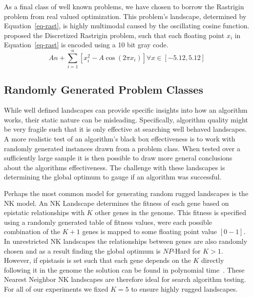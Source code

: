 \documentclass[twoside]{article}
\begin{document}
As a final class of well known problems, we have chosen to borrow the Rastrigin problem from real valued
optimization. This problem's landscape, determined by Equation~\ref{eq-rast}, is highly multimodal caused by
the oscillating cosine function. \cite{goldman:2014:p3} proposed the Discretized Rastrigin problem, such
that each floating point $x_i$ in Equation~\ref{eq-rast} is encoded using a 10 bit gray code.
\begin{equation}
  An + \sum_{i=1}^{n}\left [ x_i^2-A\cos (2\pi x_i) \right ] \forall x\in [-5.12,5.12]
  \label{eq-rast}
\end{equation}

\subsection{Randomly Generated Problem Classes}
While well defined landscapes can provide specific insights into how an algorithm works,
their static nature can be misleading. Specifically, algorithm quality might
be very fragile such that it is only effective at searching well behaved landscapes. A more realistic
test of an algorithm's black box effectiveness is to work with randomly generated instances
drawn from a problem class. When tested over a sufficiently large sample it is then possible
to draw more general conclusions about the algorithms effectiveness. The challenge with these
landscapes is determining the global optimum to gauge if an algorithm was successful.

Perhaps the most common model for generating random rugged landscapes is the NK model. An
NK Landscape determines the fitness of each gene based on epistatic relationships with $K$
other genes in the genome. This fitness is specified using a randomly generated table of
fitness values, were each possible combination of the $K+1$ genes is mapped to some floating
point value $[0-1]$. In unrestricted NK landscapes the relationships between genes are also
randomly chosen and as a result finding the global optimum is $NP$-Hard for $K>1$. However,
if epistasis is set such that each gene depends on the $K$ directly following it
in the genome the solution can be found in polynomial time~\citep{wright:2000:solvingnk}.
These Nearest Neighbor NK landscapes are therefore ideal for search algorithm testing.
For all of our experiments we fixed $K=5$ to ensure highly rugged landscapes.
\end{document}
